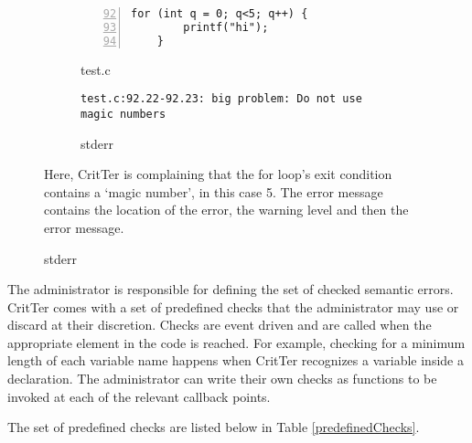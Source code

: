 \documentclass[12pt]{report}
\newcommand{\programName}{CritTer\xspace}
\begin{document}
\begin{figure}
\caption{Example Error and Corresponding Message}
\label{errorExample}
\begin{subfigure}[b]{.5\linewidth}
\caption{test.c}
\label{errorExampleCode}
\begin{lstlisting}[numbers=left, firstnumber=92,xleftmargin=1cm]
	for (int q = 0; q<5; q++) {
		printf("hi");
	}
\end{lstlisting}
\end{subfigure}
\begin{subfigure}[b]{.5\linewidth}
\caption{stderr}
\label{errorExampleStderr}
\begin{lstlisting}[xleftmargin=1cm]
test.c:92.22-92.23: big problem: Do not use magic numbers
\end{lstlisting}
\end{subfigure}
\small{Here, \programName is complaining that the for loop's exit condition contains a `magic number', in this case 5. The error message contains the location of the error, the warning level and then the error message.}
\end{figure}

The administrator is responsible for defining the set of checked semantic errors. \programName 
comes with a set of predefined checks that the administrator may use or discard at their discretion. 
Checks are event driven and are called when the appropriate element in the code is reached. For 
example, checking for a minimum length of each variable name happens when \programName 
recognizes a variable inside a declaration. The administrator can write their own checks as functions 
to be invoked at each of the relevant callback points.

The set of predefined checks are listed below in Table \ref{predefinedChecks}.
\end{document}
